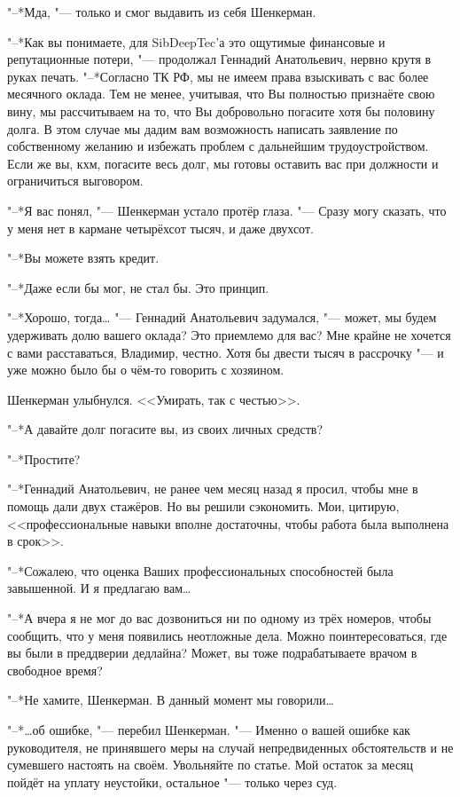"--*Мда, "--- только и смог выдавить из себя Шенкерман.

"--*Как вы понимаете, для SibDeepTec'а это ощутимые финансовые и репутационные потери, "--- продолжал Геннадий Анатольевич, нервно крутя в руках печать.
"--*Согласно ТК РФ, мы не имеем права взыскивать с вас более месячного оклада.
Тем не менее, учитывая, что Вы полностью признаёте свою вину, мы рассчитываем на то, что Вы добровольно погасите хотя бы половину долга.
В этом случае мы дадим вам возможность написать заявление по собственному желанию и избежать проблем с дальнейшим трудоустройством.
Если же вы, кхм, погасите весь долг, мы готовы оставить вас при должности и ограничиться выговором.

"--*Я вас понял, "--- Шенкерман устало протёр глаза.
"--- Сразу могу сказать, что у меня нет в кармане четырёхсот тысяч, и даже двухсот.

"--*Вы можете взять кредит.

"--*Даже если бы мог, не стал бы.
Это принцип.

"--*Хорошо, тогда\dots{} "--- Геннадий Анатольевич задумался, "--- может, мы будем удерживать долю вашего оклада?
Это приемлемо для вас?
Мне крайне не хочется с вами расставаться, Владимир, честно.
Хотя бы двести тысяч в рассрочку "--- и уже можно было бы о чём-то говорить с хозяином.

Шенкерман улыбнулся.
<<Умирать, так с честью>>.

"--*А давайте долг погасите вы, из своих личных средств?

"--*Простите?

"--*Геннадий Анатольевич, не ранее чем месяц назад я просил, чтобы мне в помощь дали двух стажёров.
Но вы решили сэкономить.
Мои, цитирую, <<профессиональные навыки вполне достаточны, чтобы работа была выполнена в срок>>.

"--*Сожалею, что оценка Ваших профессиональных способностей была завышенной.
И я предлагаю вам\dots{}

"--*А вчера я не мог до вас дозвониться ни по одному из трёх номеров, чтобы сообщить, что у меня появились неотложные дела.
Можно поинтересоваться, где вы были в преддверии дедлайна?
Может, вы тоже подрабатываете врачом в свободное время?

"--*Не хамите, Шенкерман.
В данный момент мы говорили\dots{}

"--*\dots{}об ошибке, "--- перебил Шенкерман.
"--- Именно о вашей ошибке как руководителя, не принявшего меры на случай непредвиденных обстоятельств и не сумевшего настоять на своём.
Увольняйте по статье.
Мой остаток за месяц пойдёт на уплату неустойки, остальное "--- только через суд.

